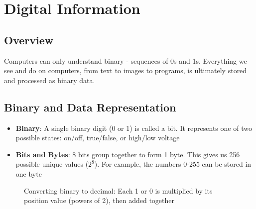 \chapter{Digital Information}

\section*{Overview}
Computers can only understand binary - sequences of 0s and 1s. Everything we see and do on computers, from text to images to programs, is ultimately stored and processed as binary data.

\section{Binary and Data Representation}
\begin{itemize}
    \item \textbf{Binary}: A single binary digit (0 or 1) is called a bit. It represents one of two possible states: on/off, true/false, or high/low voltage
    \item \textbf{Bits and Bytes}: 8 bits group together to form 1 byte. This gives us 256 possible unique values ($2^8$). For example, the numbers 0-255 can be stored in one byte
\end{itemize}

\begin{figure}[h]
    \centering
    \caption{Converting binary to decimal: Each 1 or 0 is multiplied by its position value (powers of 2), then added together}
    \label{fig:binary-byte}
\end{figure}

